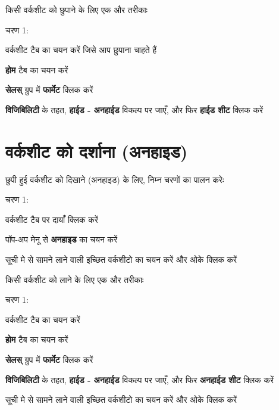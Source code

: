 किसी वर्कशीट को छुपाने के लिए एक और तरीकाः		
\begin{descriptionSimple}{चरण 1:}
\item[चरण 1] वर्कशीट टैब का चयन करें जिसे आप छुपाना चाहते हैं
\item[चरण 2] \textbf{होम} टैब का चयन करें
\item[चरण 3] \textbf{सेलस्} ग्रुप में \textbf{फार्मेट} क्लिक करें
\item[चरण 4] \textbf{विजिबिलिटी} के तहत, \textbf{हाईड - अनहाईड} विकल्प पर जाएँ, और फिर \textbf{हाईड शीट} क्लिक करें
\end{descriptionSimple}
	
\section{वर्कशीट को दर्शाना (अनहाइड)}\label{id-1.12}

छुपी हुई वर्कशीट को दिखाने (अनहाइड) के लिए, निम्न चरणों का पालन करेः
\begin{descriptionSimple}{चरण 1:}
\item[चरण 1] वर्कशीट टैब पर दायाँ क्लिक करें
\item[चरण 2] पॉप-अप मेनू से \textbf{अनहाइड} का चयन करें
\item[चरण 3] सूची मे से सामने लाने वाली इच्छित वर्कशीटो का चयन करें और ओके क्लिक करें
\end{descriptionSimple}					

किसी वर्कशीट को लाने के लिए एक और तरीकाः
\begin{descriptionSimple}{चरण 1:}
\item[चरण 1] वर्कशीट टैब का चयन करें
\item[चरण 2] \textbf{होम} टैब का चयन करें
\item[चरण 3] \textbf{सेलस्} ग्रुप में \textbf{फार्मेट} क्लिक करें
\item[चरण 4] \textbf{विजिबिलिटी} के तहत, \textbf{हाईड - अनहाईड} विकल्प पर जाएँ, और फिर \textbf{अनहाईड शीट} क्लिक करें
\item[चरण 5] सूची मे से सामने लाने वाली इच्छित वर्कशीटो का चयन करें और ओके क्लिक करें
\end{descriptionSimple}
\newpage

